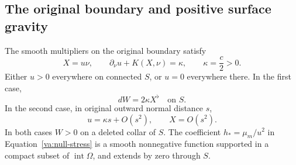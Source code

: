 \subsection{The original boundary and positive surface gravity}

\begin{proposition}\label{va:boundary}
The smooth multipliers on the original boundary satisfy
\begin{equation}\label{va:boundary-identities}
 X=u\nu,\qquad \partial_\nu u+K(X,\nu)=\kappa,
 \qquad \kappa=\frac c2>0.
\end{equation}
Either \(u>0\) everywhere on connected \(S\), or \(u=0\) everywhere
there.  In the first case,
\begin{equation}\label{va:horizon-gradient}
 dW=2\kappa X^\flat\quad\text{on }S.
\end{equation}
In the second case, in original outward normal distance \(s\),
\begin{equation}\label{va:bifurcation-expansion}
 u=\kappa s+O(s^2),\qquad X=O(s^2).
\end{equation}
In both cases \(W>0\) on a deleted collar of \(S\).  The coefficient
\(h_*=\mu_m/u^2\) in Equation~\eqref{va:null-stress} is a smooth
nonnegative function supported in a compact subset of
\(\operatorname{int}\Omega\), and extends by zero through \(S\).
\end{proposition}
